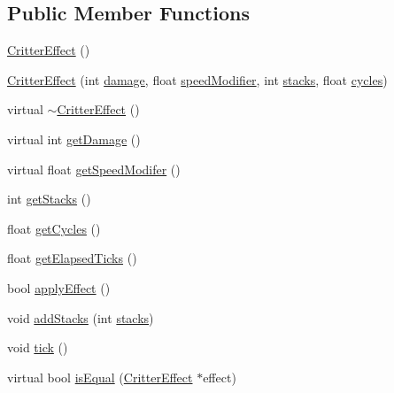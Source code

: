 \subsection*{Public Member Functions}
\begin{DoxyCompactItemize}
\item 
\hyperlink{class_critter_effect_a8aa99dff5425605e7f38ba40b4e34095}{Critter\+Effect} ()
\item 
\hyperlink{class_critter_effect_a3743356c7523d507ad2848594bc01a4c}{Critter\+Effect} (int \hyperlink{class_critter_effect_a972e96abb9c75f8af45a0a878cf2f0b9}{damage}, float \hyperlink{class_critter_effect_a70f3b198f8dacc9ca942c99b3d6ddb39}{speed\+Modifier}, int \hyperlink{class_critter_effect_ad6b5573ff377524e3e434441a0cf8496}{stacks}, float \hyperlink{class_critter_effect_aae5fb4e6fbff8c135128966ab8e9e0de}{cycles})
\item 
virtual \hyperlink{class_critter_effect_a075770a736eed494c5723f81cfe6a4ff}{$\sim$\+Critter\+Effect} ()
\item 
virtual int \hyperlink{class_critter_effect_a90ba05f6a3bc2214cbd9015807b1c966}{get\+Damage} ()
\item 
virtual float \hyperlink{class_critter_effect_aa66ba6502448706a5bc1608aa42e6847}{get\+Speed\+Modifer} ()
\item 
int \hyperlink{class_critter_effect_a4c6246bbe62acf3bfa683f40ff562a54}{get\+Stacks} ()
\item 
float \hyperlink{class_critter_effect_a3119a2498116df7dde12016aa031b26d}{get\+Cycles} ()
\item 
float \hyperlink{class_critter_effect_af010bf5eaaddf43a7f247639bf7b8b93}{get\+Elapsed\+Ticks} ()
\item 
bool \hyperlink{class_critter_effect_ae647669428e5d7b141b21a230f6cacd8}{apply\+Effect} ()
\item 
void \hyperlink{class_critter_effect_a68c08d83a3f9c37332e62cb7c0b98749}{add\+Stacks} (int \hyperlink{class_critter_effect_ad6b5573ff377524e3e434441a0cf8496}{stacks})
\item 
void \hyperlink{class_critter_effect_a54a7b5a2ebb2509b64c9f0a7436ccbcc}{tick} ()
\item 
virtual bool \hyperlink{class_critter_effect_aa8d9733ea321f972c60f5c30907f9a09}{is\+Equal} (\hyperlink{class_critter_effect}{Critter\+Effect} $\ast$effect)
\end{DoxyCompactItemize}
